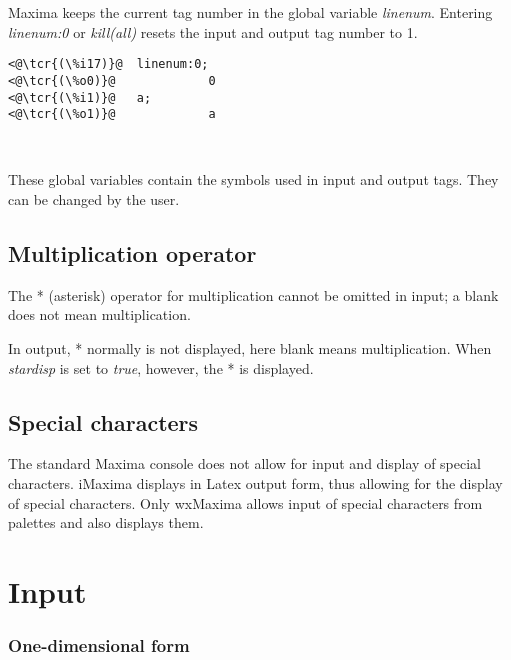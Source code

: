 \documentclass[../Maxima_Workbook.tex]{subfiles}
\begin{document}
\lzz {} \hfill \tcr{[variable]}

\lz Maxima keeps the current tag number in the global variable \emph{linenum}. Entering \emph{linenum:0} or \emph{kill(all)} resets the input and output tag number to 1.

\lz \begin{lstlisting}
<@\tcr{(\%i17)}@  linenum:0;
<@\tcr{(\%o0)}@				0
<@\tcr{(\%i1)}@   a;
<@\tcr{(\%o1)}@				a
\end{lstlisting}

\lzz {} \qquad {} \hfill \tcr{[variable]} \\
 \qquad {} \hfill \tcr{[variable]}

\lz These global variables contain the symbols used in input and output tags. They can be changed by the user.

\subsection{Multiplication operator}

\lz The * (asterisk) operator for multiplication cannot be omitted in input; a blank does not mean multiplication. 

\lzz {} \qquad {} \hfill \tcr{[variable]}\index{\%}

\lz In output, * normally is not displayed, here blank means multiplication. When \emph{stardisp} is set to \emph{true}, however, the * is displayed.

\subsection{Special characters}

The standard Maxima console does not allow for input and display of special characters. iMaxima displays in Latex output form, thus allowing for the display of special characters. Only wxMaxima allows input of special characters from palettes and also displays them.


\section{Input}

\subsubsection{One-dimensional form}
\end{document}
